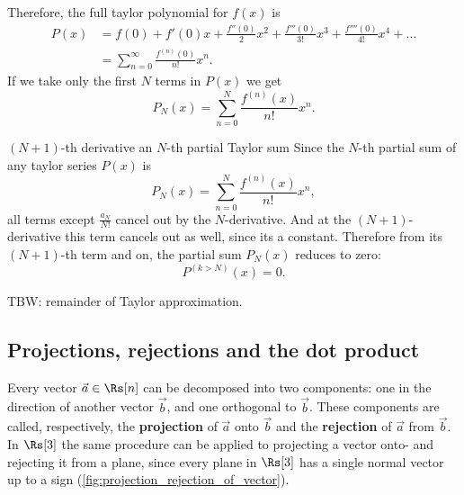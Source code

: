 Therefore, the full taylor polynomial for $f(x)$ is
\begin{equation}
	\begin{aligned}
		P(x) &= f(0) + f'(0)x + \frac{f''(0)}{2}x^{2} + \frac{f'''(0)}{3!}x^{3} + \frac{f''''(0)}{4!}x^{4} + \dots\\
			 &= \sum\limits_{n=0}^{\infty}\frac{f^{(n)}(0)}{n!}x^n.
	\end{aligned}
	\label{eq:taylor_series_around_0_full}
\end{equation}
If we take only the first $N$ terms in $P(x)$ we get
\begin{equation}
	P_{N}(x) = \sum\limits_{n=0}^{N}\frac{f^{(n)}(x)}{n!}x^{n}.
	\label{eq:partial_taylor_sum}
\end{equation}

\begin{note}{$(N+1)$-th derivative an $N$-th partial Taylor sum}{}
	Since the $N$-th partial sum of any taylor series $P(x)$ is 
	\[
		P_{N}(x)=\sum\limits_{n=0}^{N}\frac{f^{(n)}(x)}{n!}x^{n},
	\]
	all terms except $\frac{a_{N}}{N!}$ cancel out by the $N$-derivative. And at the $(N+1)$-derivative this term cancels out as well, since its a constant. Therefore from its $(N+1)$-th term and on, the partial sum $P_{N}(x)$ reduces to zero:
	\[
		P^{(k>N)}(x) = 0.
	\]
\end{note}

TBW: remainder of Taylor approximation.

\subsection{Projections, rejections and the dot product}
Every vector $\vec{a}\in\Rs[n]$ can be decomposed into two components: one in the direction of another vector $\vec{b}$, and one orthogonal to $\vec{b}$. These components are called, respectively, the \textbf{projection} of $\vec{a}$ onto $\vec{b}$ and the \textbf{rejection} of $\vec{a}$ from $\vec{b}$. In $\Rs[3]$ the same procedure can be applied to projecting a vector onto- and rejecting it from a plane, since every plane in $\Rs[3]$ has a single normal vector up to a sign (\autoref{fig:projection_rejection_of_vector}).

